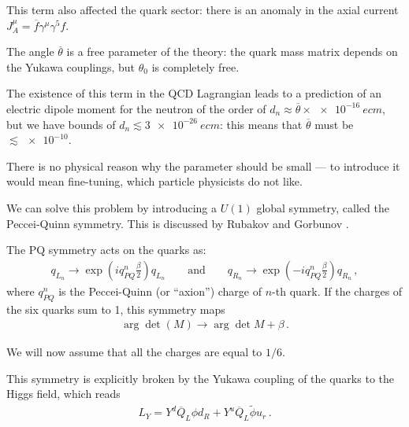 \documentclass[main.tex]{subfiles}
\begin{document}
This term also affected the quark sector: there is an anomaly in the axial current \(J^{\mu }_{A} = \overline{f} \gamma^{\mu } \gamma^{5} f\).


The angle \(\overline{\theta}\) is a free parameter of the theory: the quark mass matrix depends on the Yukawa couplings, but \(\theta_0 \) is completely free.

The existence of this term in the QCD Lagrangian leads to a prediction of an electric dipole moment for the neutron of the order of \(d_n \approx \overline{\theta} \times \SI{e-16}{e cm}\), but we have bounds of \(d_n \lesssim \SI{3e-26}{e cm}\): this means that \(\overline{\theta}\) must be \(\lesssim \num{e-10}\).

There is no physical reason why the parameter should be small --- to introduce it would mean fine-tuning, which particle physicists do not like.

We can solve this problem by introducing a \(U(1)\) global symmetry, called the Peccei-Quinn symmetry. 
This is discussed by Rubakov and Gorbunov \cite[eq.\ 9.93 onward]{gorbunovIntroductionTheoryEarly2011}.

The PQ symmetry acts on the quarks as: 
%
\begin{align}
q_{L_n} \to \exp(i q_{PQ}^{n} \frac{\beta}{2}) q_{L_n}
\qquad \text{and} \qquad
q_{R_n} \to \exp(-i q_{PQ}^{n} \frac{\beta}{2}) q_{R_n}
\,,
\end{align}
%
where \(q_{PQ}^{n}\) is the Peccei-Quinn (or ``axion'') charge of \(n\)-th quark. 
If the charges of the six quarks sum to 1, this symmetry maps 
%
\begin{align}
\arg \det (M) \to \arg \det M + \beta 
\,.
\end{align}

We will now assume that all the charges are equal to \(1/6\).

This symmetry is explicitly broken by the Yukawa coupling of the quarks to the Higgs field, which reads 
%
\begin{align}
L_Y = Y^{d} \overline{Q}_L \phi d_R + Y^{u} \overline{Q}_L \widetilde{\phi} u_r
\,.
\end{align}
\end{document}
